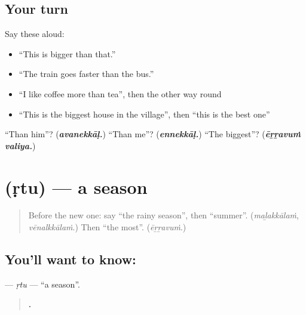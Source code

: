 \subsection*{Your turn}
Say these aloud:

\begin{itemize}
\raggedright
  \item \textquotedblleft{}This is bigger than that.\textquotedblright{}
  \item \textquotedblleft{}The train goes faster than the bus.\textquotedblright{}
  \item \textquotedblleft{}I like coffee more than tea\textquotedblright{}, then the other way round
  \item \textquotedblleft{}This is the biggest house in the village\textquotedblright{}, then \textquotedblleft{}this is the best one\textquotedblright{}
\end{itemize}

\begin{tcolorbox}[breakable,colback=teal!4,colframe=teal!35!black,title={Before you move on}]
\textquotedblleft{}Than him\textquotedblright{}? (\emph{\textbf{avanekkāḷ.}}) \textquotedblleft{}Than me\textquotedblright{}? (\emph{\textbf{ennekkāḷ.}}) \textquotedblleft{}The biggest\textquotedblright{}? (\emph{\textbf{ēṟṟavuṁ valiya.}})
\end{tcolorbox}
\section[\texorpdfstring{\ml{ഋതു} (ṛtu)}{ഋതു (ṛtu)}]{ (ṛtu) — a season}

\label{lesson:ML-C346-rtu}



\begin{quote}
Before the new one: say \textquotedblleft{}the rainy season\textquotedblright{}, then \textquotedblleft{}summer\textquotedblright{}. (\emph{maḻakkālaṁ}, \emph{vēnalkkālaṁ}.) Then \textquotedblleft{}the most\textquotedblright{}. (\emph{ēṟṟavuṁ}.)
\end{quote}

\subsection*{You'll want to know: }
\textbf{} — \emph{ṛtu} — \textquotedblleft{}a season\textquotedblright{}.

\begin{quote}
\textbf{    .}
\end{quote}

